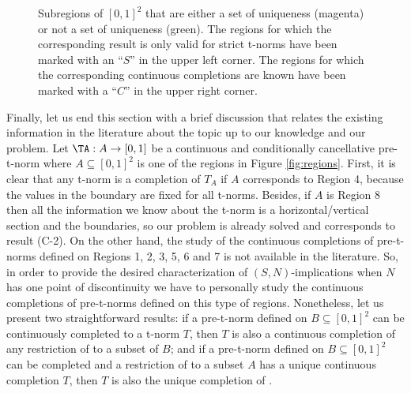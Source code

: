 \begin{figure}[t!]
\begin{subfigure}{.2\textwidth}
{
		}
	\end{subfigure}
	\caption{Subregions of $[0,1]^2$ that are either a set of uniqueness (magenta) or not a set of uniqueness (green). The regions for which the corresponding result is only valid for strict t-norms have been marked with an ``$S$'' in the upper left corner. The regions for which the corresponding continuous completions are known have been marked with a ``$C$'' in the upper right corner.}
	\label{fig:SurveyCompletions}
\end{figure}

Finally, let us end this section with a brief discussion that relates the existing information in the literature about the topic up to our knowledge and our problem. Let $\TA : A \to [0,1]$ be a continuous and conditionally cancellative pre-t-norm where $A \subseteq [0,1]^2$ is one of the regions in Figure \ref{fig:regions}. First, it is clear that any t-norm is a completion of $T_A$ if $A$ corresponds to Region 4, because the values in the boundary are fixed for all t-norms. Besides, if $A$ is Region 8 then all the information we know about the t-norm is a horizontal/vertical section and the boundaries, so our problem is already solved and corresponds to result (C-2). On the other hand, the study of the continuous completions of pre-t-norms defined on Regions 1, 2, 3, 5, 6 and 7 is not available in the literature. So, in order to provide  the desired characterization of $(S,N)$-implications when $N$ has one point of discontinuity we have to personally study the continuous completions of pre-t-norms defined on this type of regions. Nonetheless, let us present two straightforward results: if a pre-t-norm \TB defined on $B \subseteq [0,1]^2$ can be continuously completed to a t-norm $T$, then $T$ is also a continuous completion of any restriction of \TB to a subset of $B$; and if a pre-t-norm \TB defined on $B \subseteq [0,1]^2$ can be completed and a restriction of \TB to a subset $A$ has a unique continuous completion $T$, then $T$ is also the unique completion of \TB.  


